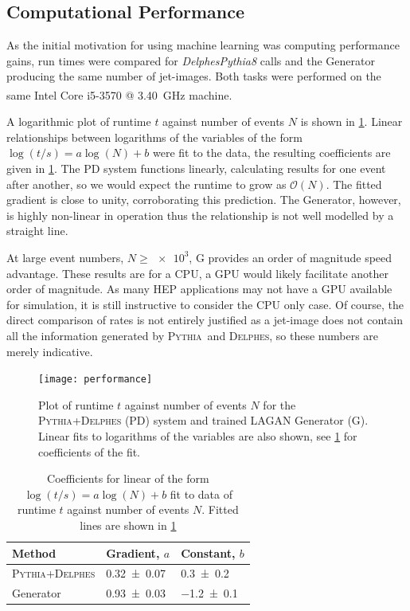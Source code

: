 \documentclass[twocolumn]{article}
\newcommand{\pkg}[1]{\textsc{#1}}
\newcommand{\pythia}{\pkg{Pythia}}
\newcommand{\delphes}{\pkg{Delphes}}
\begin{document}
\subsection[Computational Performance]{\protect\justifying\protect\RaggedRight Computational Performance}
\label{sec:comp}

As the initial motivation for using machine learning was computing performance gains, run times were compared for \textit{DelphesPythia8} calls and the Generator producing the same number of jet-images. Both tasks were performed on the same Intel\textsuperscript{\textregistered} Core\textsuperscript{\texttrademark} i5-3570 @ \SI{3.40}{\giga\hertz} machine.

A logarithmic plot of runtime $t$ against number of events $N$ is shown in \cref{fig:performance}. Linear relationships between logarithms of the variables of the form $\log(t/s) = a\log(N) + b$ were fit to the data, the resulting coefficients are given in \cref{tab:speed}. The PD system functions linearly, calculating results for one event after another, so we would expect the runtime to grow as $\mathcal{O}(N)$. The fitted gradient is close to unity, corroborating this prediction. The Generator, however, is highly non-linear in operation thus the relationship is not well modelled by a straight line. 

At large event numbers, $N \geq \num{e3}$, G provides an order of magnitude speed advantage. These results are for a CPU, a GPU would likely facilitate another order of magnitude. As many HEP applications may not have a GPU available for simulation, it is still instructive to consider the CPU only case. Of course, the direct comparison of rates is not entirely justified as a jet-image does not contain all the information generated by \pythia~and \delphes, so these numbers are merely indicative.
\begin{figure}[H]
	\centering
	\texttt{[image: performance]}
	
	\caption{Plot of runtime $t$ against number of events $N$ for the \pkg{Pythia}+\pkg{Delphes} (PD) system and trained LAGAN Generator (G). Linear fits to logarithms of the variables are also shown, see \cref{tab:speed} for coefficients of the fit.}
	\label{fig:performance}
	
\end{figure}

\begin{table}[!htbp]
	\centering
	\begin{tabular}{@{}lll@{}}
		\toprule Method  & Gradient, $a$ & Constant, $b$\\
		\midrule \pythia+\delphes  & \num{0.32+-0.07} & \num{0.3+-0.2}\\
				 Generator  & \num{0.93+-0.03} & \num{-1.2+-0.1}\\
		
		\bottomrule
	\end{tabular}
	\caption{Coefficients for linear of the form  $\log(t/s) = a\log(N) + b$ fit to data of runtime $t$ against number of events $N$. Fitted lines are shown in \cref{fig:performance}}
	\label{tab:speed}
\end{table}
\end{document}
